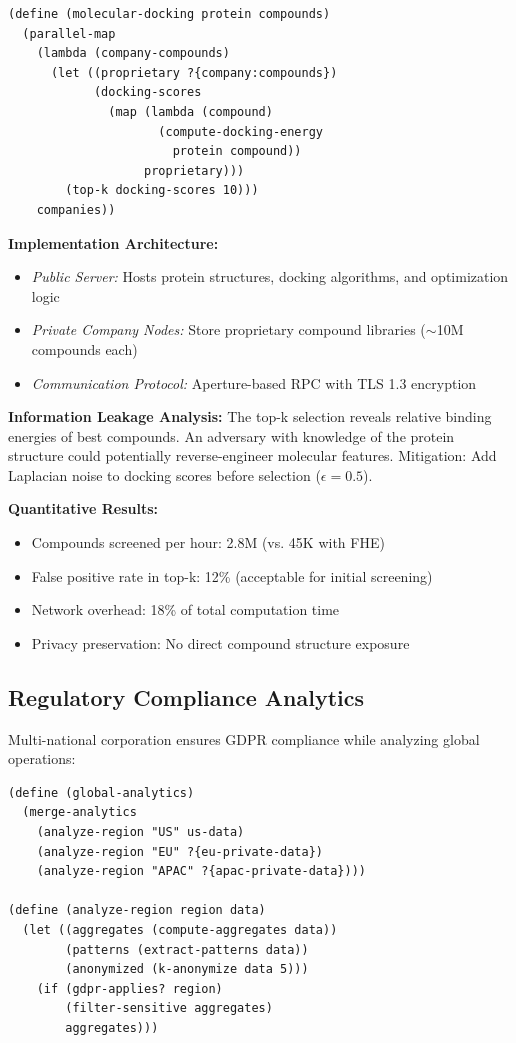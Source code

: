 \documentclass[12pt]{article}
\begin{document}
\begin{lstlisting}
(define (molecular-docking protein compounds)
  (parallel-map 
    (lambda (company-compounds)
      (let ((proprietary ?{company:compounds})
            (docking-scores 
              (map (lambda (compound)
                     (compute-docking-energy 
                       protein compound))
                   proprietary)))
        (top-k docking-scores 10)))
    companies))
\end{lstlisting}

\textbf{Implementation Architecture:}
\begin{itemize}
  \item \textit{Public Server:} Hosts protein structures, docking algorithms, and optimization logic
  \item \textit{Private Company Nodes:} Store proprietary compound libraries ($\sim$10M compounds each)
  \item \textit{Communication Protocol:} Aperture-based RPC with TLS 1.3 encryption
\end{itemize}

\textbf{Information Leakage Analysis:} The top-k selection reveals relative binding energies of best compounds. An adversary with knowledge of the protein structure could potentially reverse-engineer molecular features. Mitigation: Add Laplacian noise to docking scores before selection ($\epsilon = 0.5$).

\textbf{Quantitative Results:}
\begin{itemize}
  \item Compounds screened per hour: 2.8M (vs. 45K with FHE)
  \item False positive rate in top-k: 12\% (acceptable for initial screening)
  \item Network overhead: 18\% of total computation time
  \item Privacy preservation: No direct compound structure exposure
\end{itemize}

\subsection{Regulatory Compliance Analytics}

Multi-national corporation ensures GDPR compliance while analyzing global operations:

\begin{lstlisting}
(define (global-analytics)
  (merge-analytics
    (analyze-region "US" us-data)
    (analyze-region "EU" ?{eu-private-data})
    (analyze-region "APAC" ?{apac-private-data})))

(define (analyze-region region data)
  (let ((aggregates (compute-aggregates data))
        (patterns (extract-patterns data))
        (anonymized (k-anonymize data 5)))
    (if (gdpr-applies? region)
        (filter-sensitive aggregates)
        aggregates)))
\end{lstlisting}
\end{document}
